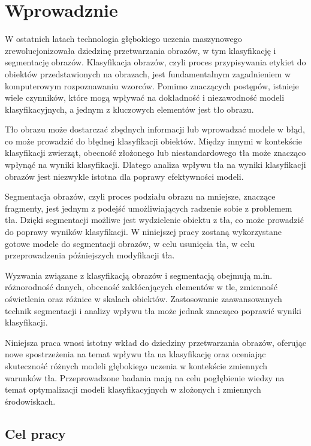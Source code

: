 
\chapter*{Wprowadznie}

W ostatnich latach technologia głębokiego uczenia maszynowego zrewolucjonizowała dziedzinę
przetwarzania obrazów, w tym klasyfikację i segmentację obrazów. Klasyfikacja obrazów, 
czyli proces przypisywania etykiet do obiektów przedstawionych na obrazach, jest fundamentalnym
zagadnieniem w komputerowym rozpoznawaniu wzorców. Pomimo znaczących postępów, istnieje wiele 
czynników, które mogą wpływać na dokładność i niezawodność modeli klasyfikacyjnych, a jednym z 
kluczowych elementów jest tło obrazu.

Tło obrazu może dostarczać zbędnych informacji lub wprowadzać modele w błąd, co może prowadzić 
do błędnej klasyfikacji obiektów. Między innymi w kontekście klasyfikacji zwierząt, obecność 
złożonego lub niestandardowego tła może znacząco wpłynąć na wyniki klasyfikacji. Dlatego analiza 
wpływu tła na wyniki klasyfikacji obrazów jest niezwykle istotna dla poprawy efektywności modeli.

Segmentacja obrazów, czyli proces podziału obrazu na mniejsze, znaczące fragmenty, jest jednym z 
podejść umożliwiających radzenie sobie z problemem tła. Dzięki segmentacji możliwe jest wydzielenie 
obiektu z tła, co może prowadzić do poprawy wyników klasyfikacji. W niniejszej pracy zostaną 
wykorzystane gotowe modele do segmentacji obrazów, w celu usunięcia tła, w celu przeprowadzenia 
późniejszych modyfikacji tła.

Wyzwania związane z klasyfikacją obrazów i segmentacją obejmują m.in. różnorodność danych, 
obecność zakłócających elementów w tle, zmienność oświetlenia oraz różnice w skalach obiektów. 
Zastosowanie zaawansowanych technik segmentacji i analizy wpływu tła może jednak znacząco poprawić
wyniki klasyfikacji.

Niniejsza praca wnosi istotny wkład do dziedziny przetwarzania obrazów, oferując nowe spostrzeżenia
na temat wpływu tła na klasyfikację oraz oceniając skuteczność różnych modeli głębokiego uczenia w 
kontekście zmiennych warunków tła. Przeprowadzone badania mają na celu pogłębienie wiedzy na temat 
optymalizacji modeli klasyfikacyjnych w złożonych i zmiennych środowiskach.

\section*{Cel pracy}


